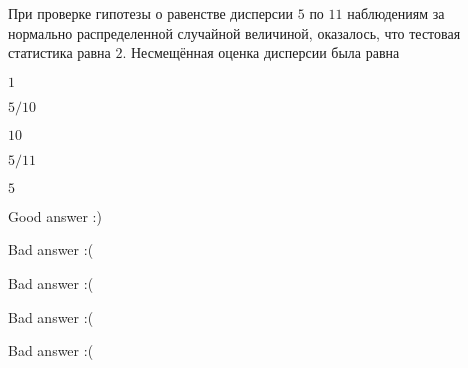 
\begin{question}
При проверке гипотезы о равенстве дисперсии \(5\) по \(11\) наблюдениям
за нормально распределенной случайной величиной, оказалось, что тестовая
статистика равна \(2\). Несмещённая оценка дисперсии была равна
\begin{answerlist}
  \item \(1\)
  \item \(5/10\)
  \item \(10\)
  \item \(5/11\)
  \item \(5\)
\end{answerlist}
\end{question}

\begin{solution}
\begin{answerlist}
  \item Good answer :)
  \item Bad answer :(
  \item Bad answer :(
  \item Bad answer :(
  \item Bad answer :(
\end{answerlist}
\end{solution}

